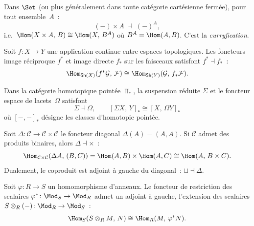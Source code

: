 \begin{exemple}\label{ex:produit-hom}
Dans $\Set$ (ou plus généralement dans toute catégorie cartésienne fermée),
pour tout ensemble~$A$~:
\[
    (-)\times A \;\dashv\; (-)^A,
\]
i.e.\ $\Hom(X\times A,\, B)\cong\Hom(X,\, B^A)$ où $B^A=\Hom(A,B)$.
C'est la \emph{curryfication}.
\end{exemple}

\begin{exemple}\label{ex:faisceaux}
Soit $f\colon X\to Y$ une application continue entre espaces topologiques.
Les foncteurs image réciproque $f^*$ et image directe $f_*$ sur les
faisceaux satisfont $f^*\dashv f_*$~:
\[
    \Hom_{\mathsf{Sh}(X)}(f^*\mathcal{G},\,\mathcal{F})
    \cong \Hom_{\mathsf{Sh}(Y)}(\mathcal{G},\,f_*\mathcal{F}).
\]
\end{exemple}

\begin{exemple}\label{ex:suspension-lacets}
Dans la catégorie homotopique pointée $\Top_*$, la suspension réduite
$\Sigma$ et le foncteur espace de lacets~$\Omega$ satisfont
\[
    \Sigma \dashv \Omega,\qquad
    [\Sigma X,\,Y]_* \cong [X,\,\Omega Y]_*
\]
où $[-,-]_*$ désigne les classes d'homotopie pointée.
\end{exemple}

\begin{exemple}\label{ex:diagonal-produit}
Soit $\Delta\colon\mathcal{C}\to\mathcal{C}\times\mathcal{C}$ le foncteur
diagonal $\Delta(A)=(A,A)$. Si $\mathcal{C}$ admet des produits binaires,
alors $\Delta\dashv\times$~:
\[
    \Hom_{\mathcal{C}\times\mathcal{C}}(\Delta A,\,(B,C))
    = \Hom(A,B)\times\Hom(A,C)
    \cong \Hom(A,\,B\times C).
\]
Dualement, le coproduit est adjoint à gauche du diagonal~:
$\sqcup\dashv\Delta$.
\end{exemple}

\begin{exemple}\label{ex:scalaires}
Soit $\varphi\colon R\to S$ un homomorphisme d'anneaux.
Le foncteur de restriction des scalaires $\varphi^*\colon\Mod_S\to\Mod_R$
admet un adjoint à gauche, l'extension des scalaires
$S\otimes_R(-)\colon\Mod_R\to\Mod_S$~:
\[
    \Hom_S(S\otimes_R M,\, N) \cong \Hom_R(M,\,\varphi^* N).
\]
\end{exemple}


